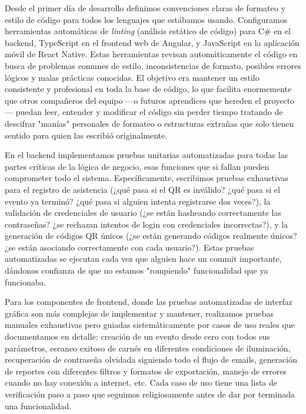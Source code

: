 Desde el primer día de desarrollo definimos convenciones claras de formateo y estilo de código para todos los lenguajes que estábamos usando. Configuramos herramientas automáticas de \textit{linting} (análisis estático de código) para C\# en el backend, TypeScript en el frontend web de Angular, y JavaScript en la aplicación móvil de React Native. Estas herramientas revisan automáticamente el código en busca de problemas comunes de estilo, inconsistencias de formato, posibles errores lógicos y malas prácticas conocidas. El objetivo era mantener un estilo consistente y profesional en toda la base de código, lo que facilita enormemente que otros compañeros del equipo —o futuros aprendices que hereden el proyecto— puedan leer, entender y modificar el código sin perder tiempo tratando de descifrar "manías" personales de formateo o estructuras extrañas que solo tienen sentido para quien las escribió originalmente.

En el backend implementamos pruebas unitarias automatizadas para todas las partes críticas de la lógica de negocio, esas funciones que si fallan pueden comprometer todo el sistema. Específicamente, escribimos pruebas exhaustivas para el registro de asistencia (¿qué pasa si el QR es inválido? ¿qué pasa si el evento ya terminó? ¿qué pasa si alguien intenta registrarse dos veces?), la validación de credenciales de usuario (¿se están hasheando correctamente las contraseñas? ¿se rechazan intentos de login con credenciales incorrectas?), y la generación de códigos QR únicos (¿se están generando códigos realmente únicos? ¿se están asociando correctamente con cada usuario?). Estas pruebas automatizadas se ejecutan cada vez que alguien hace un commit importante, dándonos confianza de que no estamos "rompiendo" funcionalidad que ya funcionaba.

Para los componentes de frontend, donde las pruebas automatizadas de interfaz gráfica son más complejas de implementar y mantener, realizamos pruebas manuales exhaustivas pero guiadas sistemáticamente por casos de uso reales que documentamos en detalle: creación de un evento desde cero con todos sus parámetros, escaneo exitoso de carnés en diferentes condiciones de iluminación, recuperación de contraseña olvidada siguiendo todo el flujo de emails, generación de reportes con diferentes filtros y formatos de exportación, manejo de errores cuando no hay conexión a internet, etc. Cada caso de uso tiene una lista de verificación paso a paso que seguimos religiosamente antes de dar por terminada una funcionalidad.

